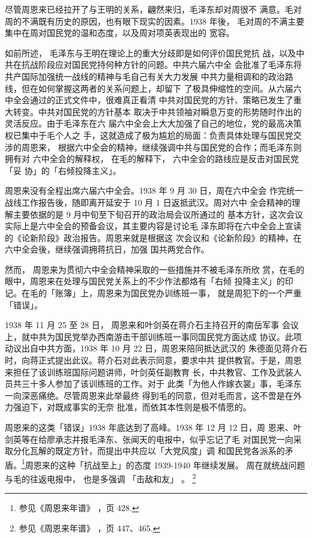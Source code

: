 尽管周恩来已经拉开了与王明的关系，翩然来归，毛泽东却对周很不
满意。毛对周的不满既有历史的原因，也有眼下现实的因素。1938 年後，
毛对周的不满主要集中在周对国民党的温和态度，以及周对项英表现出的
宽容。

如前所述，
毛泽东与王明在理论上的重大分歧即是如何评价国民党抗
战，以及中共在抗战阶段应对国民党持何种方针的问题。中共六届六中全
会批准了毛泽东将共产国际加强统一战线的精神与毛自己有关大力发展
中共力量相调和的政治路线，但在如何掌握这两者的关系问题上，却留下
了极具伸缩性的空间。从六届六中全会通过的正式文件中，很难真正看清
中共对国民党的方针、策略已发生了重大转变。中共对国民党的方针基本
取决于中共领袖对瞬息万变的形势随时作出的灵活反应。由于毛泽东在六
届六中全会上大大加强了自己的地位，党的最高决策权已集中于毛个人之
手，这就造成了极为尴尬的局面：负责具体处理与国民党交涉的周恩来，
根据六中全会的精神，继续强调中共与国民党的合作；而毛泽东则拥有对
六中全会的解释权，
在毛的解释下，
六中全会的路线应是反击对国民党
「妥
协」的「右倾投降主义」。

周恩来没有全程出席六届六中全会。1938 年 9 月 30 日，周在六中全会
作完统一战线工作报告後，随即离开延安于 10 月 1 日返抵武汉。周对六中
全会精神的理解主要依据的是 9 月中旬至下旬召开的政治局会议所通过的
基本方针，这次会议实际上是六中全会的预备会议，其主要内容是讨论毛
泽东即将在六中全会上宣读的《论新阶段》政治报告。周恩来就是根据这
次会议和《论新阶段》的精神，在六中全会後，继续强调拥蒋抗日，加强
国共两党合作。

然而，
周恩来为贯彻六中全会精神采取的一些措施并不被毛泽东所欣
赏，在毛的眼中，周恩来在处理与国民党关系上的不少作法都烙有「右倾
投降主义」的印记。在毛的「账簿」上，周恩来为国民党办训练班一事，
就是周犯下的一个严重「错误」。

1938 年 11 月 25 至 28 日，
周恩来和叶剑英在蒋介石主持召开的南岳军事
会议上，就中共为国民党举办西南游击干部训练班一事同国民党方面达成
协议。此项动议出自中共方面，1938 年 10 月 22 日，周恩来陪同抵达武汉的
朱德面见蒋介石时，向蒋正式提出此议。蒋介石对此表示同意，要求中共
提供教官。于是，周恩来担任了该训练班国际问题讲师，叶剑英任副教育
长，中共教官、工作及武装人员共三十多人参加了该训练班的工作。对于
此类「为他人作嫁衣裳」事，毛泽东一向深恶痛绝。尽管周恩来此举最终
得到毛的同意，但对毛而言，这不啻是在外力强迫下，对既成事实的无奈
批准，而依其本性则是极不情愿的。

周恩来的这类「错误」1938 年底达到了高峰。1938 年 12 月 12 日，周
恩来、叶剑英等在给廖承志并报毛泽东、张闻天的电报中，似乎忘记了毛
对国民党一向采取分化瓦解的既定方针，而提出中共应以「大党风度」调
和国民党各派系的矛盾。\footnote{参见《周恩来年谱》
，页 428.}周恩来的这种「抗战至上」的态度 1939-1940
年继续发展。
周在就统战问题与毛的往返电报中，
也是多强调
「击敌和友」
。
\footnote{参见《周恩来年谱》
，页 447、465.}

